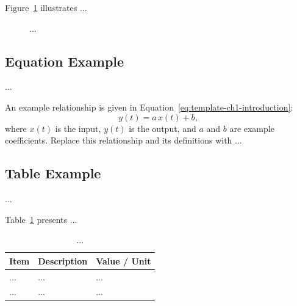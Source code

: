 Figure~\ref{fig:template-ch1-introduction} illustrates ...
\begin{figure}[htbp]
    \centering
    \caption{...}
    \label{fig:template-ch1-introduction}
\end{figure}

\subsection{Equation Example}
...

An example relationship is given in Equation~\eqref{eq:template-ch1-introduction}:
\begin{equation}
    y(t) = a\,x(t) + b,
    \label{eq:template-ch1-introduction}
\end{equation}
where $x(t)$ is the input, $y(t)$ is the output, and $a$ and $b$ are
example coefficients. Replace this relationship and its definitions with ...

\subsection{Table Example}
...

Table~\ref{tab:template-ch1-introduction} presents ...
\begin{table}[htbp]
    \centering
    \caption{...}
    \label{tab:template-ch1-introduction}
    \begin{tabularx}{0.9\linewidth}{lXX}
        \toprule
        \textbf{Item} & \textbf{Description} & \textbf{Value / Unit} \\
        \midrule
        ... & ... & ... \\
        ... & ... & ... \\
        \bottomrule
    \end{tabularx}
\end{table}

